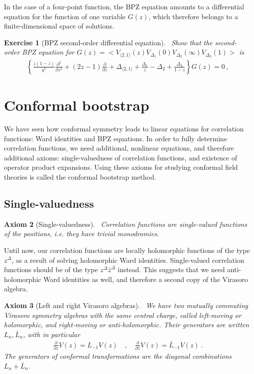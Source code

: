 \documentclass[12pt, a4paper]{article}
\theoremstyle{break}
\newtheorem{exo}{Exercise}[section]
\newtheorem{hyp}[exo]{Axiom}
\begin{document}
In the case of a four-point function, the BPZ equation amounts to a differential equation for the function of one variable $G(z)$, which therefore belongs to a finite-dimensional space of solutions.

\begin{exo}[BPZ second-order differential equation]
 ~\label{exo:bpz}
 Show that the second-order BPZ equation for $G(z)=\Big< V_{\langle 2, 1 \rangle}(z) V_{\Delta_1}(0)V_{\Delta_2}(\infty)V_{\Delta_3}(1) \Big>$ is
 \begin{align}
  \left\{ \frac{z(1-z)}{b^2}\frac{\partial^2}{\partial z^2} + (2z-1){\frac{\partial}{\partial z}} +\Delta_{\langle 2,1 \rangle} +\frac{\Delta_1}{z}-\Delta_2 + \frac{\Delta_3}{1-z}\right\} G(z)=0\ ,
\label{eq:ode}
 \end{align}
\end{exo}


\section{Conformal bootstrap}

We have seen how conformal symmetry leads to linear equations for correlation functions: Ward identities and BPZ equations. 
In order to fully determine correlation functions, we need additional, nonlinear equations, and therefore additional axioms: single-valuedness of correlation functions, and existence of operator product expansions. 
Using these axioms for studying conformal field theories is called the conformal bootstrap method. 

\subsection{Single-valuedness}

\begin{hyp}[Single-valuedness]
 ~\label{hyp:sv}
 Correlation functions are single-valued functions of the positions, i.e. they have trivial monodromies.
\end{hyp}

Until now, our correlation functions are locally holomorphic functions of the type $z^\Delta$, as a result of solving holomorphic Ward identities. Single-valued correlation functions should be of the type $z^\Delta \bar z^\Delta$ instead. 
This suggests that we need anti-holomorphic Ward identities as well, and therefore a second copy of the Virasoro algebra.

\begin{hyp}[Left and right Virasoro algebras]
 ~\label{hyp:lr}
 We have two mutually commuting Virasoro symmetry algebras with the same central charge, called left-moving or holomorphic, and right-moving or anti-holomorphic. Their generators are written $L_n,\bar L_n$, with in particular
 \begin{align}
  \frac{\partial}{\partial z} V(z) = L_{-1}V(z)   \quad , \quad \frac{\partial}{\partial \bar z} V(z)= \bar L_{-1} V(z)   \ .
 \end{align}
 The generators of conformal transformations are the diagonal combinations $L_n+\bar L_n$.
\end{hyp}
\end{document}
